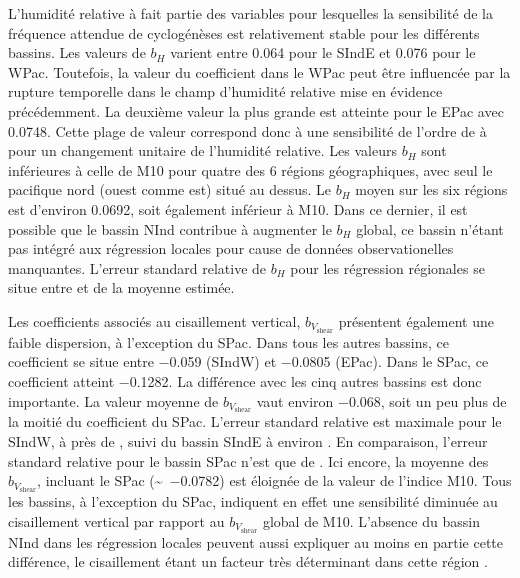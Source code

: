 \documentclass[../main.tex]{subfiles}
\begin{document}
L'humidité relative à  fait partie des variables pour lesquelles la sensibilité de la fréquence attendue de cyclogénèses est relativement stable pour les
différents bassins. Les valeurs de $b_H$ varient entre \num{0.064} pour le SIndE et \num{0.076} pour le WPac. Toutefois, la valeur du coefficient dans le WPac
peut être influencée par la rupture temporelle dans le champ d'humidité relative mise en évidence précédemment. La deuxième valeur la plus grande est atteinte
pour le EPac avec \num{0.0748}. Cette plage de valeur correspond donc à une sensibilité de l'ordre de  à  pour un changement unitaire de
l'humidité relative. Les valeurs $b_H$ sont inférieures à celle de M10 pour quatre des 6 régions géographiques, avec seul le pacifique nord (ouest comme est)
situé au dessus. Le $b_H$ moyen sur les six régions est d'environ \num{0.0692}, soit également inférieur à M10. Dans ce dernier, il est possible que le bassin
NInd contribue à augmenter le $b_H$ global, ce bassin n'étant pas intégré aux régression locales pour cause de données observationelles manquantes. L'erreur
standard relative de $b_H$ pour les régression régionales se situe entre  et  de la moyenne estimée.

Les coefficients associés au cisaillement vertical, $b_{V_{\mathrm{shear}}}$ présentent également une faible dispersion, à l'exception du SPac. Dans tous les
autres bassins, ce coefficient se situe entre \num{-0.059} (SIndW) et \num{-0.0805} (EPac). Dans le SPac, ce coefficient atteint \num{-0.1282}. La différence
avec les cinq autres bassins est donc importante. La valeur moyenne de $b_{V_{\mathrm{shear}}}$ vaut environ \num{-0.068}, soit un peu plus de la moitié du
coefficient du SPac. L'erreur standard relative est maximale pour le SIndW, à près de , suivi du bassin SIndE à environ . En comparaison,
l'erreur standard relative pour le bassin SPac n'est que de . Ici encore, la moyenne des $b_{V_{\mathrm{shear}}}$, incluant le SPac
(\sim~\num{-0.0782}) est éloignée de la valeur de l'indice M10. Tous les bassins, à l'exception du SPac, indiquent en effet une sensibilité diminuée au
cisaillement vertical par rapport au $b_{V_{\mathrm{shear}}}$ global de M10. L'absence du bassin NInd dans les régression locales peuvent aussi expliquer au
moins en partie cette différence, le cisaillement étant un facteur très déterminant dans cette région \parencite{gray_global_1968}.
\end{document}
